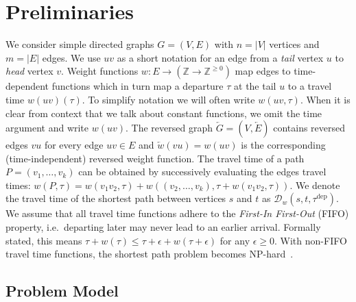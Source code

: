 \documentclass[a4paper,UKenglish,cleveref, autoref, thm-restate,anonymous]{lipics-v2021}
\newcommand*{\dist}{\mathcal{D}}
\newcommand*{\tdep}{\tau^{\operatorname{dep}}}
\begin{document}
\section{Preliminaries}
We consider simple directed graphs $G=(V,E)$ with $n=|V|$ vertices and $m=|E|$ edges.
We use $uv$ as a short notation for an edge from a \emph{tail} vertex $u$ to \emph{head} vertex $v$.
Weight functions $w : E \to (\mathbb{Z} \to \mathbb{Z}^{\geq 0})$ map edges to time-dependent functions which in turn map a departure $\tau$ at the tail $u$ to a travel time $w(uv)(\tau)$.
To simplify notation we will often write $w(uv, \tau)$.
When it is clear from context that we talk about constant functions, we omit the time argument and write $w(uv)$.
The reversed graph $\overleftarrow{G} = (V, \overleftarrow{E})$ contains reversed edges $vu$ for every edge $uv \in E$ and $\overleftarrow{w}(vu) = w(uv)$ is the corresponding (time-independent) reversed weight function.
The travel time of a path $P = (v_1,\dots,v_k)$ can be obtained by successively evaluating the edges travel times: $w(P, \tau) = w(v_1 v_2, \tau) + w((v_2,\dots,v_k), \tau + w(v_1 v_2, \tau))$.
We denote the travel time of the shortest path between vertices $s$ and $t$ as $\dist_w(s,t,\tdep)$.
We assume that all travel time functions adhere to the \emph{First-In First-Out} (FIFO) property, i.e.\ departing later may never lead to an earlier arrival.
Formally stated, this means $\tau + w(\tau) \leq \tau + \epsilon + w(\tau + \epsilon)$ for any $\epsilon \geq 0$.
With non-FIFO travel time functions, the shortest path problem becomes \textsf{NP}-hard~\cite{or-tnp-89}.

\subsection{Problem Model}
\end{document}
